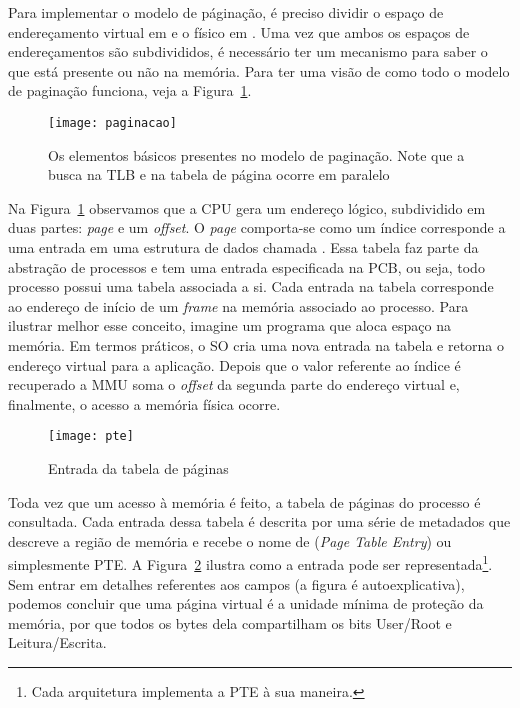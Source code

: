 Para implementar o modelo de páginação, é preciso dividir o espaço de
endereçamento virtual em  e o físico em
. Uma vez que ambos os espaços de endereçamentos são
subdivididos, é necessário ter um mecanismo para saber o que está presente ou
não na memória. Para ter uma visão de como todo o modelo de paginação funciona,
veja a Figura~\ref{fig:paginacao}.

\begin{figure}[!h]
  \centering
  \texttt{[image: paginacao]} 
	\caption[Os elementos básicos presentes no modelo de paginação.]{Os elementos básicos presentes no modelo de paginação. Note que a busca na TLB e na tabela de página ocorre em paralelo}
  \label{fig:paginacao}
\end{figure}

Na Figura~\ref{fig:paginacao} observamos que a CPU gera um endereço lógico,
subdividido em duas partes: \textit{page} e um \textit{offset}. O \emph{page}
comporta-se como um índice corresponde a uma entrada em uma estrutura de dados
chamada . Essa tabela faz parte da abstração
de processos e tem uma entrada especificada na PCB, ou seja, todo processo
possui uma tabela associada a si. Cada entrada na tabela corresponde ao
endereço de início de um \emph{frame} na memória associado ao processo.  Para
ilustrar melhor esse conceito, imagine um programa que aloca espaço na memória.
Em termos práticos, o SO cria uma nova entrada na tabela e retorna o endereço
virtual para a aplicação.  Depois que o valor referente ao índice é recuperado
a MMU soma o \textit{offset} da segunda parte do endereço virtual e, finalmente,
o acesso a memória física ocorre.

\begin{figure}[!h]
  \centering
  \texttt{[image: pte]}
  \caption{Entrada da tabela de páginas}
  \label{fig:pte}
\end{figure}

Toda vez que um acesso à memória é feito, a tabela de páginas do processo é
consultada. Cada entrada dessa tabela é descrita por uma série de metadados que
descreve a região de memória e recebe o nome de  (\textit{Page Table Entry}) ou simplesmente PTE. A
Figura~\ref{fig:pte} ilustra como a entrada pode ser representada\footnote{Cada
arquitetura implementa a PTE à sua maneira.}. Sem entrar em detalhes referentes
aos campos (a figura é autoexplicativa), podemos concluir que uma página
virtual é a unidade mínima de proteção da memória, por que todos os bytes dela
compartilham os bits User/Root e Leitura/Escrita.


